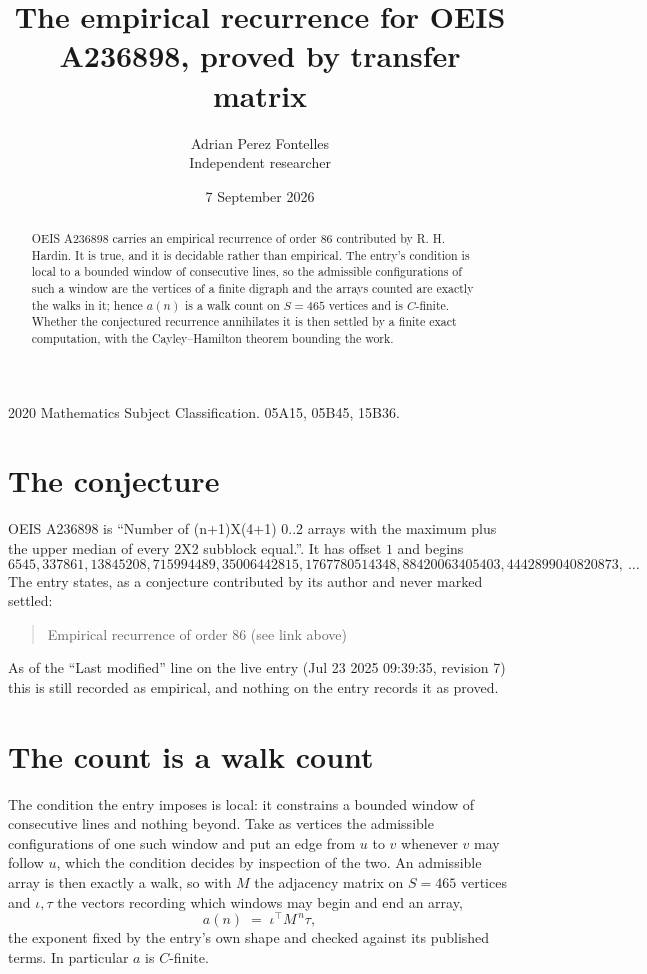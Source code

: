 \documentclass[11pt,a4paper]{article}
\title{The empirical recurrence for OEIS A236898, proved by transfer matrix}
\author{Adrian Perez Fontelles\\ \small Independent researcher}
\date{7 September 2026}
\theoremstyle{plain}
\theoremstyle{definition}
\begin{document}
\maketitle

\begin{abstract}
OEIS A236898 carries an empirical recurrence of order $86$ contributed by R. H. Hardin. It is
true, and it is decidable rather than empirical. The entry's condition is local to a bounded window of consecutive lines, so
the admissible configurations of such a window are the vertices of a finite digraph and the
arrays counted are exactly the walks in it; hence $a(n)$ is a walk count on $S=465$ vertices
and is $C$-finite. Whether the conjectured recurrence annihilates it is then settled by a
finite exact computation, with the Cayley--Hamilton theorem bounding the work.
\end{abstract}

\noindent\small 2020 Mathematics Subject Classification. 05A15, 05B45, 15B36.\normalsize

\section{The conjecture}

OEIS A236898 is ``Number of (n+1)X(4+1) 0..2 arrays with the maximum plus the upper median of every 2X2 subblock equal.''. It has offset $1$ and begins
\[
6545, 337861, 13845208, 715994489, 35006442815, 1767780514348, 88420063405403, 4442899040820873,\ \dots
\]
The entry states, as a conjecture contributed by its author and never marked settled:
\begin{quote}
Empirical recurrence of order 86 (see link above)
\end{quote}
As of the ``Last modified'' line on the live entry (Jul 23 2025 09:39:35, revision 7) this is still
recorded as empirical, and nothing on the entry records it as proved.

\section{The count is a walk count}

The condition the entry imposes is local: it constrains a bounded window of consecutive lines and nothing beyond. Take as
vertices the admissible configurations of one such window and put an edge from $u$ to $v$
whenever $v$ may follow $u$, which the condition decides by inspection of the two. An
admissible array is then exactly a walk, so with $M$ the adjacency matrix on $S=465$ vertices
and $\iota,\tau$ the vectors recording which windows may begin and end an array,
\[
a(n)\;=\;\iota^{\!\top}M^{\,n}\tau ,
\]
the exponent fixed by the entry's own shape and checked against its published terms. In
particular $a$ is $C$-finite.
\end{document}
